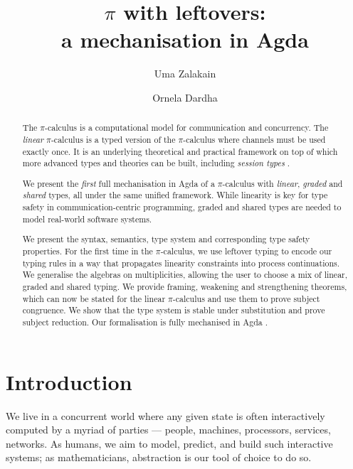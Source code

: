 \documentclass[a4paper,UKenglish,cleveref,autoref,thm-restate,authorcolumns]{lipics-v2019}
\title{$\pi$ with leftovers: \\ a mechanisation in Agda}
\author{Uma Zalakain}{University of Glasgow, Scotland}
       {u.zalakain.1@research.gla.ac.uk}{https://orcid.org/0000-0002-3268-9338}{}
\author{Ornela Dardha}{University of Glasgow, Scotland}
       {ornela.dardha@glasgow.ac.uk}{https://orcid.org/0000-0001-9927-7875}{}
\theoremstyle{definition}
\newcommand{\picalc}{$\pi$-calculus}
\begin{document}
\maketitle

\begin{abstract}
  The \picalc{} is a computational model for communication and concurrency.
  The \emph{linear} \picalc{} is a typed version of the \picalc{} where channels must be used exactly once.
  It is an underlying theoretical and practical framework on top of which more advanced types and theories can be built, including \emph{session types} \cite{H93,THK94,HVK98}.

  We present the \emph{first} full mechanisation in Agda of a \picalc{} with \emph{linear}, \emph{graded} and \emph{shared} types, all under the same unified framework.
  While linearity is key for type safety in communication-centric programming, graded and shared types are needed to model real-world software systems.
  
  We present the syntax, semantics, type system and corresponding type safety properties.
  For the first time in the \picalc{}, we use leftover typing \cite{Allais2018a} to encode our typing rules in a way that propagates linearity constraints into process continuations.
  We generalise the algebras on multiplicities, allowing the user to choose a mix of linear, graded and shared typing.
  We provide framing, weakening and strengthening theorems, which can now be stated for the linear \picalc{} and use them to prove subject congruence.
  We show that the type system is stable under substitution and prove subject reduction.
%
  Our formalisation is fully mechanised in Agda \cite{Zalakain2020Agda}.
\end{abstract}

\section{Introduction}

We live in a concurrent world where any given state is often interactively computed by a myriad of parties --- people, machines, processors, services, networks.
As humans, we aim to model, predict, and build such interactive systems; as mathematicians, abstraction is our tool of choice to do so.
\end{document}

